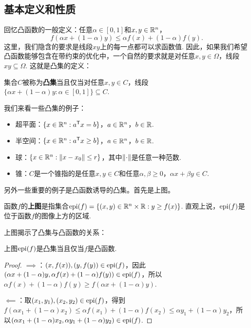 \subsection{基本定义和性质}
回忆凸函数的一般定义：任意$\alpha\in[0,1]$和$x,y\in\mathbb{R}^n$，
    \[
        f(\alpha x+(1-\alpha) y)\leq \alpha f(x)+(1-\alpha) f(y).
    \]
这里，我们隐含的要求是线段$xy$上的每一点都可以求函数值. 因此，如果我们希望凸函数能够包含在带约束的优化中，一个自然的要求就是对任意$x,y\in \Omega$，线段$xy\subseteq \Omega$. 这就是凸集的定义：

\begin{definition}[凸集]
集合$C$被称为\textbf{凸集}当且仅当对任意$x,y\in C$，线段$\{\alpha x+(1-\alpha)y:\alpha\in [0,1]\}\subseteq C$.
\end{definition}

我们来看一些凸集的例子：
\begin{example}
\begin{itemize}
    \item 超平面：$\{x\in\mathbb{R}^n:a^{\mathsf{T}} x= b\}$，$a\in\mathbb{R}^n$，$b\in\mathbb{R}$. 
    \item 半空间：$\{x\in\mathbb{R}^n:a^{\mathsf{T}} x\geq b\}$，$a\in\mathbb{R}^n$，$b\in\mathbb{R}$. 
    \item 球：$\{x\in\mathbb{R}^n:\left\|x-x_0\right\|\leq r\}$，其中$\left\|\cdot\right\|$是任意一种范数. 
    \item 锥：$C$是一个锥指的是任意$x,y\in C$和任意$\alpha,\beta\geq 0$，$\alpha x+\beta y\in C$. 
\end{itemize}
\end{example}

另外一些重要的例子是凸函数诱导的凸集。首先是上图。

\begin{definition}[上图]
    函数$f$的\textbf{上图}是指集合$\operatorname*{epi}(f)=\{(x,y)\in\mathbb{R}^{n}\times\mathbb{R}:y\geq f(x)\}$. 直观上说，$\operatorname*{epi}(f)$是位于函数$f$的图像上方的区域.
\end{definition}


上图揭示了凸集与凸函数的关系：
\begin{theorem}
    上图$\operatorname*{epi}(f)$是凸集当且仅当$f$是凸函数.
\end{theorem}

\begin{proof}
$\implies$：$(x,f(x)),(y,f(y))\in\operatorname*{epi}(f)$，因此$(\alpha x+(1-\alpha)y,\alpha f(x)+(1-\alpha)f(y))\in\operatorname*{epi}(f)$，所以$\alpha f(x)+(1-\alpha)f(y)\geq f(\alpha x+(1-\alpha)y)$.

$\impliedby$：取$(x_1,y_1),(x_2,y_2)\in\operatorname*{epi}(f)$，得到$f(\alpha x_1+(1-\alpha) x_2)\leq\alpha f(x_1)+(1-\alpha)f(x_2)\leq\alpha y_1+(1-\alpha) y_2$，所以$(\alpha x_1+(1-\alpha) x_2,\alpha y_1+(1-\alpha) y_2)\in\operatorname*{epi}(f)$.
\end{proof}

